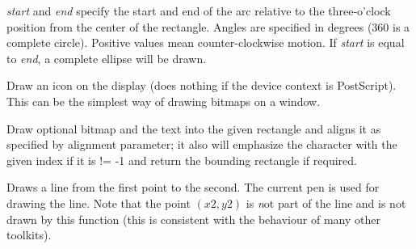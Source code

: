{\it start} and {\it end} specify the start and end of the arc relative to the three-o'clock
position from the center of the rectangle. Angles are specified
in degrees (360 is a complete circle). Positive values mean
counter-clockwise motion. If {\it start} is equal to {\it end}, a
complete ellipse will be drawn.


\label{wxdcdrawicon}


Draw an icon on the display (does nothing if the device context is PostScript).
This can be the simplest way of drawing bitmaps on a window.


\label{wxdcdrawlabel}



Draw optional bitmap and the text into the given rectangle and aligns it as specified
by alignment parameter; it also will emphasize the character with the given index if
it is != -1 and return the bounding rectangle if required.


\label{wxdcdrawline}


Draws a line from the first point to the second. The current pen is used
for drawing the line. Note that the point $(x2, y2)$ is {\emph not} part of the
line and is not drawn by this function (this is consistent with the behaviour
of many other toolkits).


\label{wxdcdrawlines}


